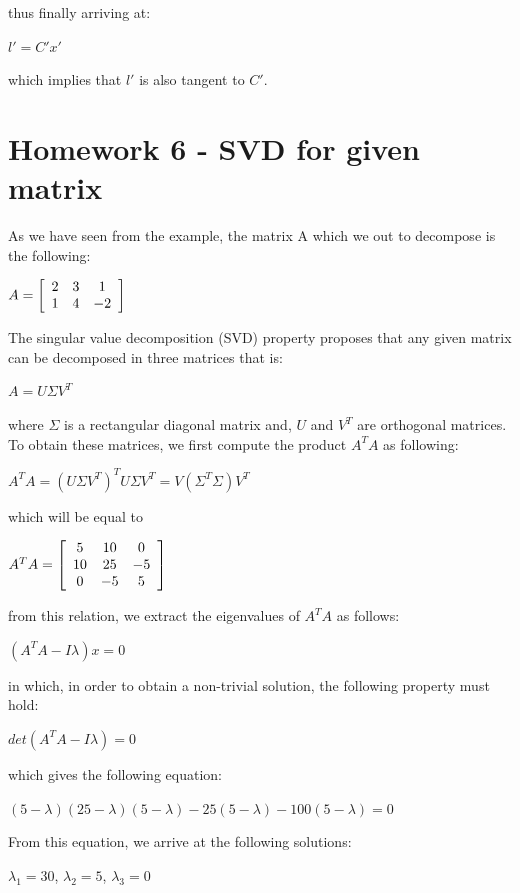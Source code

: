 \documentclass[]{article}
\begin{document}
thus finally arriving at:

\centerline {
	$l' = C'x'$
}

which implies that $l'$ is also tangent to $C'$.

\section{Homework 6 - SVD for given matrix}
As we have seen from the example, the matrix A which we out to decompose is the following: 

\centerline{ $A = \left[ {\begin{array}{*{20}c}
		2 & 3 & 1 \\
		1 & 4 & -2   
		\end{array} } \right]$ }
	
The singular value decomposition (SVD) property proposes that any given matrix can be decomposed in three matrices that is:

\centerline { $A = U \Sigma V^T$}

where $\Sigma$ is a rectangular diagonal matrix and, $U$ and $V^T$ are orthogonal matrices. To obtain these matrices, we first compute the product $A^TA$ as following:

\centerline {
	$A^TA = (U \Sigma V^T)^T U \Sigma V^T = V (\Sigma^T \Sigma)V^T $ 
}
which will be equal to 

\centerline{ $A^TA = \left[ {\begin{array}{*{20}c}
		5 & 10 & 0 \\
		10 & 25 & -5 \\ 
		0 & -5 & 5   
		\end{array} } \right]$ }
	
from this relation, we extract the eigenvalues of $A^TA$ as follows:
	
\centerline {
	$(A^TA - I \lambda) x = 0$
}

in which, in order to obtain a non-trivial solution, the following property must hold:

\centerline {
	$det(A^TA - I \lambda) = 0$
}

which gives the following equation:

\centerline {
	$(5- \lambda) (25 - \lambda)(5 - \lambda) - 25(5 - \lambda) - 100(5 - \lambda) = 0 $
}

From this equation, we arrive at the following solutions: 

\centerline {
	$\lambda_{1} = 30$, $\lambda_{2} = 5$, $\lambda_{3} = 0$ 
}
\end{document}
